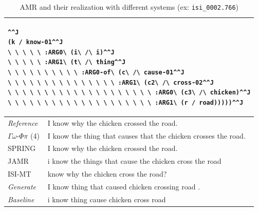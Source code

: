 \documentclass[12pt]{article}
\newcommand{\systeme}[1]{\textsc{#1}}
\newcommand{\gophipy}{$\Gamma\omega$-$\Phi\pi$}
\newcommand{\jamr}{\systeme{JAMR}}
\newcommand{\isimt}{\systeme{ISI-MT}}
\newcommand{\spring}{\systeme{SPRING}}
\begin{document}
\noindent
\begin{table}[ht]
\begin{tabular}{|p{1in}|p{5.25in}|}%
\hline
\multicolumn{2}{|p{6in}|}{
\begin{lstlisting}^^J
(k / know-01^^J
\ \ \ \ \ :ARG0\ (i\ /\ i)^^J
\ \ \ \ \ :ARG1\ (t\ /\ thing^^J
\ \ \ \ \ \ \ \ \ \ :ARG0-of\ (c\ /\ cause-01^^J
\ \ \ \ \ \ \ \ \ \ \ \ \ \ \ :ARG1\ (c2\ /\ cross-02^^J
\ \ \ \ \ \ \ \ \ \ \ \ \ \ \ \ \ \ \ \ :ARG0\ (c3\ /\ chicken)^^J
\ \ \ \ \ \ \ \ \ \ \ \ \ \ \ \ \ \ \ \ :ARG1\ (r / road)))))^^J
\end{lstlisting}
}\\\hline
\emph{Reference}&  I know why the chicken crossed the road.\\\hline
\gophipy{} (4)&I know the thing that causes that the chicken crosses the road.\\\hline
\spring{} & I know why the chicken crossed the road.\\ \hline
\jamr{}&i know the things that cause the chicken cross the road\\\hline
\isimt{}&know why the chicken cross the road? \\\hline
\emph{Generate}& I know thing that caused chicken crossing road .\\\hline
\emph{Baseline}&i know thing cause chicken cross road\\
\hline
\end{tabular}
\caption{AMR and their realization with different systems (ex: \texttt{isi\_0002.766})}
\label{ex:isi_0002.766}
\end{table}
\end{document}
